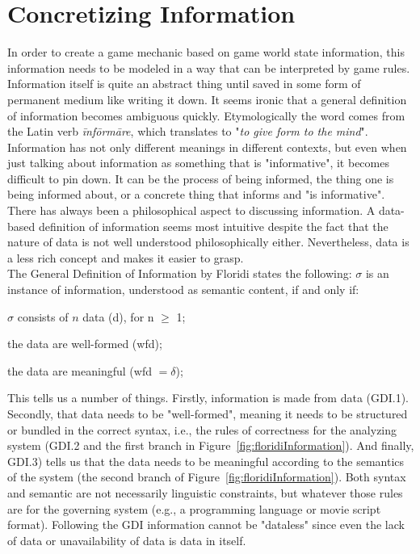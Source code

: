 \section{Concretizing Information}
\label{section:info}
In order to create a game mechanic based on game world state information, this information needs to be modeled in a way that can be interpreted by game rules. Information itself is quite an abstract thing until saved in some form of permanent medium like writing it down. It seems ironic that a general definition of information becomes ambiguous quickly. Etymologically the word comes from the Latin verb \textit{\={i}nf\={o}rm\={a}re}, which translates to "\textit{to give form to the mind}". Information has not only different meanings in different contexts, but even when just talking about information as something that is "informative", it becomes difficult to pin down. It can be the process of being informed, the thing one is being informed about, or a concrete thing that informs and "is informative".~\cite{Buckland1991}\\
There has always been a philosophical aspect to discussing information. A data-based definition of information seems most intuitive despite the fact that the nature of data is not well understood philosophically either. Nevertheless, data is a less rich concept and makes it easier to grasp.\\
The General Definition of Information by Floridi states the following:
\vspace*{0.5cm}
 $\sigma$ is an instance of information, understood as semantic content, if and only if:\par
{} $\sigma$ consists of $n$ data (d), for n $\geq$ 1;\par
{} the data are well-formed (wfd);\par
{} the data are meaningful (wfd $= \delta$);\par
\vspace*{0.5cm}
This tells us a number of things. Firstly, information is made from data (GDI.1). Secondly, that data needs to be "well-formed", meaning it needs to be structured or bundled in the correct syntax, i.e., the rules of correctness for the analyzing system (GDI.2 and the first branch in Figure~\ref{fig:floridiInformation}). And finally, GDI.3) tells us that the data needs to be meaningful according to the semantics of the system (the second branch of Figure~\ref{fig:floridiInformation}). Both syntax and semantic are not necessarily linguistic constraints, but whatever those rules are for the governing system (e.g., a programming language or movie script format). Following the GDI information cannot be "dataless" since even the lack of data or unavailability of data is data in itself.~\cite{Floridi2010}\\
